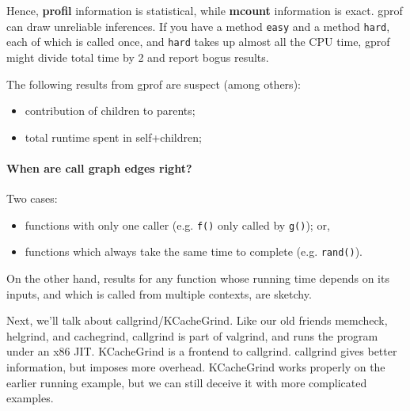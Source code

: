 \documentclass[a4paper]{report}
\begin{document}
Hence, {\bf profil} information is statistical, while {\bf mcount}
information is exact.  gprof can draw unreliable inferences. If you have a method \texttt{easy} and a method \texttt{hard}, each of which is called once, and \texttt{hard} takes up almost all the CPU time,
gprof might divide total time by 2 and report bogus results.

The following results from gprof are suspect (among others):
\vspace*{-1em}
\begin{itemize}[noitemsep]
  \item contribution of children to parents;
  \item total runtime spent in self+children;
\end{itemize}
\vspace*{-1em}

\paragraph{When are call graph edges right?}
Two cases:
\vspace*{-1em}
    \begin{itemize}[noitemsep]
    \item functions with only one caller
      (e.g. {\tt f()} only called by {\tt g()}); or,
    \item functions which always take the same time to complete
      (e.g. {\tt rand()}).
    \end{itemize}
\vspace*{-1em}

On the other hand, results for any function whose running time depends on its inputs,
and which is called from multiple contexts, are sketchy.


Next, we'll talk about callgrind/KCacheGrind. Like our old friends memcheck, helgrind, and cachegrind, callgrind is part of valgrind, and runs the program under an x86 JIT.  KCacheGrind is a frontend to callgrind. callgrind gives better information, but imposes
more overhead.
KCacheGrind works properly on the earlier running example, but we can still deceive it with more complicated examples.

\end{document}
